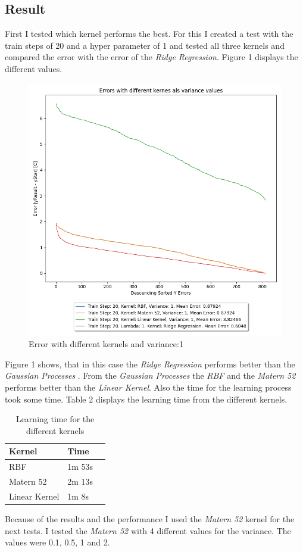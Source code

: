 \documentclass[10pt, a4paper, twocolumn]{article} %
\begin{document}
\subsection{Result}
First I tested which kernel performs the best. For this I created a test with the train steps of 20 and a hyper parameter of 1 and tested all three kernels and compared the error with the error of the \textit{Ridge Regression}. Figure 1 displays the different values. 
\begin{figure}[htbp] %
  \centering
  \includegraphics[width=\columnwidth]{pics/TrainStep20_V_1.png}
  \caption{Error with different kernels and variance:1}
  \label{fig:fibonacciPlot}
\end{figure}
Figure 1 shows, that in this case the \textit{Ridge Regression} performs better than the \textit{Gaussian Processes }. From the \textit{Gaussian Processes} the \textit{RBF} and the \textit{Matern 52} performs better than the \textit{Linear Kernel}. Also the time for the learning process took some time. Table 2 displays the learning time from the different kernels. 

\begin{table}[htbp]
    \label{tab:kernelSettings}
	\caption{Learning time for the different kernels}
	\centering
	\begin{tabular}{llr}
		\cmidrule(r){1-2}
		Kernel & Time \\
		\midrule
		RBF & 1m 53s\\	
		Matern 52 & 2m 13s\\				
		Linear Kernel & 1m 8s\\
		\bottomrule
	\end{tabular}
\end{table}
Because of the results and the performance I used the \textit{Matern 52} kernel for the next tests. I tested the \textit{Matern 52} with 4 different values for the variance. The values were 0.1, 0.5, 1 and 2. 
\end{document}
